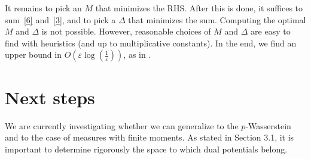 \documentclass[12pt]{report}
\theoremstyle{definition}
\theoremstyle{remark}
\begin{document}
It remains to pick an $M$ that minimizes the RHS. After this is done, it suffices to sum~\eqref{6} and~\eqref{3}, and to pick a $\Delta$ that minimizes the sum. Computing the optimal $M$ and $\Delta$ is not possible. However, reasonable choices of $M$ and $\Delta$ are easy to find with heuristics (and up to multiplicative constants). In the end, we find an upper bound in $O\left(\varepsilon \log\left(\frac 1\varepsilon \right)\right)$, as in \cite{genevay2018sample}.

\section{Next steps}

\hspace{\parindent} We are currently investigating whether we can generalize \cite{mena2019statistical} to the $p$-Wasserstein and to the case of measures with finite moments. As stated in Section 3.1, it is important to determine rigorously the space to which dual potentials belong.

\newpage 


\end{document}
